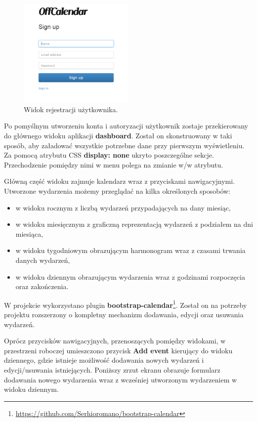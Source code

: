 \begin{figure}[H]
\centering
\includegraphics[width=0.5\textwidth]{register.png}
\caption{Widok rejestracji użytkownika.}
\end{figure}

Po pomyślnym utworzeniu konta i autoryzacji użytkownik zostaje przekierowany do głównego widoku aplikacji \textbf{dashboard}. Został on skonstruowany w taki sposób, aby załadować wszystkie potrzebne dane przy pierwszym wyświetleniu. Za pomocą atrybutu CSS \textbf{display: none} ukryto poszczególne sekcje. Przechodzenie pomiędzy nimi w menu polega na zmianie w/w atrybutu.

Główną część widoku zajmuje kalendarz wraz z przyciskami nawigacyjnymi. Utworzone wydarzenia możemy przeglądać na kilka określonych sposobów:

\begin{itemize}
\item w widoku rocznym z liczbą wydarzeń przypadających na dany miesiąc,
\item w widoku miesięcznym z graficzną reprezentacją wydarzeń z podziałem na dni miesiąca,
\item w widoku tygodniowym obrazującym harmonogram wraz z czasami trwania danych wydarzeń,
\item w widoku dziennym obrazującym wydarzenia wraz z godzinami rozpoczęcia oraz zakończenia.
\end{itemize}

W projekcie wykorzystano plugin \textbf{bootstrap-calendar}\footnote{\url{https://github.com/Serhioromano/bootstrap-calendar}}. Został on na potrzeby projektu rozszerzony o kompletny mechanizm dodawania, edycji oraz usuwania wydarzeń.

Oprócz przycisków nawigacyjnych, przenoszących pomiędzy widokami, w przestrzeni roboczej umieszczono przycisk \textbf{Add event} kierujący do widoku dziennego, gdzie istnieje możliwość dodawania nowych wydarzeń i edycji/usuwania istniejących. Poniższy zrzut ekranu obrazuje formularz dodawania nowego wydarzenia wraz z wcześniej utworzonym wydarzeniem w widoku dziennym.

